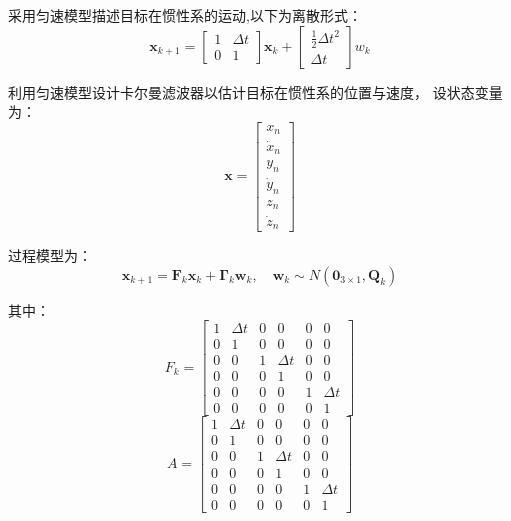 \par
采用匀速模型描述目标在惯性系的运动,以下为离散形式：
\begin{equation} \boldsymbol x_{k+1} =\left[\begin{array}{cc} {1} & \Delta t  \\ 0 & {1}  \end{array}\right]\boldsymbol x_{k} + \left[\begin{array}{c} {\frac{1}{2}\Delta t^2} \\ {\Delta t}  \end{array}\right]w_k \end{equation}



利用匀速模型设计卡尔曼滤波器以估计目标在惯性系的位置与速度，
设状态变量为：\begin{equation} \boldsymbol x =\left[\begin{array}{c} x_n\\ \dot x_n\\ y_n\\ \dot y_n\\ z_n\\ \dot z_n \end{array}\right] \end{equation}
\par
过程模型为：\begin{equation} \boldsymbol  x_{k+1} = \boldsymbol F_k\boldsymbol  x_k + \boldsymbol{\Gamma}_{k}\boldsymbol {w}_{k}, \quad \boldsymbol {w}_{k} \sim N\left(\boldsymbol 0_{3 \times 1}, \boldsymbol Q_k \right) \end{equation}

其中： 
\begin{equation} F_k =\left[\begin{array}{cccccc} 1 &  \Delta t & 0 &0&0&0\\ 0 &  1 & 0 &0&0&0\\ 0 & 0 & 1&  \Delta t & 0 &0\\ 0&0&   0&1 &0 &0\\ 0 &0& 0 &0& 1 &\Delta t \\ 0 &0& 0 & 0 &0 &1 \end{array}\right] \end{equation}
\begin{equation} A =\left[\begin{array}{cccccc} 1 &  \Delta t & 0 &0&0&0\\ 0 &  1 & 0 &0&0&0\\ 0 & 0 & 1&  \Delta t & 0 &0\\ 0&0&   0&1 &0 &0\\ 0 &0& 0 &0& 1 &\Delta t \\ 0 &0& 0 & 0 &0 &1 \end{array}\right] \end{equation}

